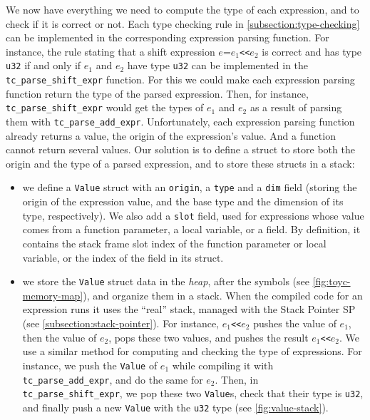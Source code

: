 We now have everything we need to compute the type of each expression, and to
check if it is correct or not. Each type checking rule in
\cref{subsection:type-checking} can be implemented in the corresponding
expression parsing function. For instance, the rule stating that a
shift expression $e$={\tt $e_1${<}{<}$e_2$} is correct and has type {\tt
u32} if and only if $e_1$ and $e_2$ have type {\tt u32} can be implemented in
the {\tt tc\_parse\_shift\_expr} function. For this we could make each
expression parsing function return the type of the parsed expression. Then,
for instance, {\tt tc\_parse\_shift\_expr} would get the types of $e_1$ and
$e_2$ as a result of parsing them with {\tt tc\_parse\_add\_expr}.
Unfortunately, each expression parsing function already returns a value, the
origin of the expression's value. And a function cannot return several values.
Our solution is to define a struct to store both the origin and the type of a
parsed expression, and to store these structs in a stack:
\begin{itemize}
  \item we define a {\tt Value} struct with an {\tt origin}, a {\tt type} and a
  {\tt dim} field (storing the origin of the expression value, and the base
  type and the dimension of its type, respectively). We also add a {\tt slot}
  field, used for expressions whose value comes from a function parameter, a
  local variable, or a field. By definition, it contains the stack frame slot
  index of the function parameter or local variable, or the index of the field
  in its struct.

  \item we store the {\tt Value} struct data in the {\em heap}, after the
  symbols (see \cref{fig:toyc-memory-map}), and organize them in a stack. When
  the compiled code for an expression runs it uses the ``real'' stack, managed
  with the Stack Pointer SP (see \cref{subsection:stack-pointer}). For
  instance, {\tt $e_1${<}{<}$e_2$} pushes the value of $e_1$, then the value of
  $e_2$, pops these two values, and pushes the result {\tt $e_1${<}{<}$e_2$}.
  We use a similar method for computing and checking the type of expressions.
  For instance, we push the {\tt Value} of $e_1$ while compiling it with {\tt
  tc\_parse\_add\_expr}, and do the same for $e_2$. Then, in {\tt
  tc\_parse\_shift\_expr}, we pop these two {\tt Value}s, check that their type
  is {\tt u32}, and finally push a new {\tt Value} with the {\tt u32} type (see
  \cref{fig:value-stack}).
\end{itemize}


